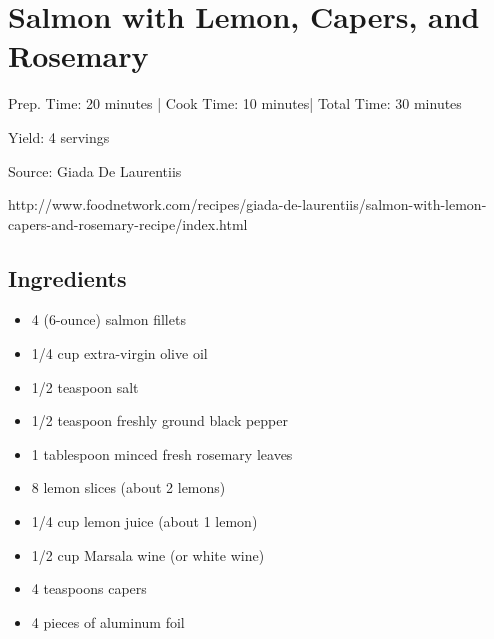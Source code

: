 \section{Salmon with Lemon, Capers, and Rosemary}

\begin{center}
Prep. Time: 20 minutes |
Cook Time: 10 minutes|
Total Time: 30 minutes
 
Yield: 4 servings

\vspace{1em}

Source: Giada De Laurentiis\par
http://www.foodnetwork.com/recipes/giada-de-laurentiis/salmon-with-lemon-capers-and-rosemary-recipe/index.html
\end{center}

\subsection{Ingredients}
\begin{itemize}

    \item 4 (6-ounce) salmon fillets
    \item 1/4 cup extra-virgin olive oil
    \item 1/2 teaspoon salt
    \item 1/2 teaspoon freshly ground black pepper
    \item 1 tablespoon minced fresh rosemary leaves
    \item 8 lemon slices (about 2 lemons)
    \item 1/4 cup lemon juice (about 1 lemon)
    \item 1/2 cup Marsala wine (or white wine)
    \item 4 teaspoons capers
    \item 4 pieces of aluminum foil

\end{itemize}

